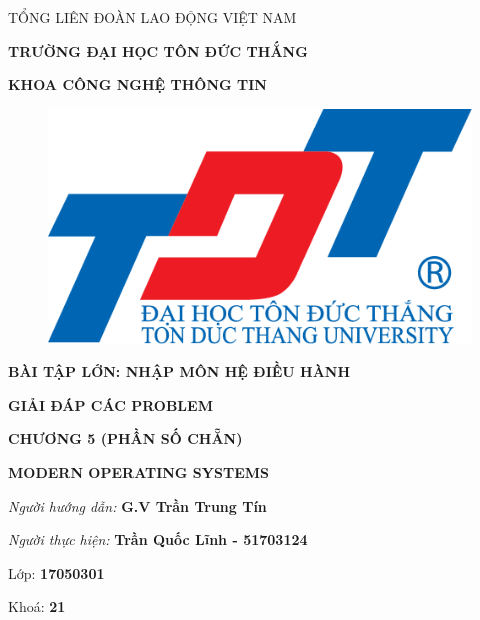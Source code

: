 \documentclass{report}
\begin{document}
\newcommand{\xfill}[2][1ex]{{%
  \dimen0=#2\advance\dimen0 by #1
  \leaders\hrule height \dimen0 depth -#1\hfill%
}}

\changefontsizes[14pt]{12pt}
\centerline{TỔNG LIÊN ĐOÀN LAO ĐỘNG VIỆT NAM}

\changefontsizes[14pt]{11pt}
\centerline{\textbf{TRƯỜNG ĐẠI HỌC TÔN ĐỨC THẮNG}}
\centerline{\textbf{KHOA CÔNG NGHỆ THÔNG TIN}}

\begin{center}
    \begin{figure}[htp]
    \begin{center}
     \includegraphics[scale=.2]{logo}
    \end{center}
    \end{figure}
\end{center}

\changefontsizes{16pt}
\centerline{\textbf{BÀI TẬP LỚN: NHẬP MÔN HỆ ĐIỀU HÀNH}}
\vspace{1.5cm}
\changefontsizes{24pt}
\centerline{\textbf{GIẢI ĐÁP CÁC PROBLEM}}
\centerline{\textbf{CHƯƠNG 5 (PHẦN SỐ CHẴN)}}
\centerline{\textbf{MODERN OPERATING SYSTEMS}}

\vspace{4cm}
\begin{flushright}
\renewcommand{\baselinestretch}{0.05}
\changefontsizes{14pt}
\textit{Người hướng dẫn: }\textbf{G.V Trần Trung Tín}
\setlength{\parskip}{0.5em}

\textit{Người thực hiện: }\textbf{Trần Quốc Lĩnh - 51703124}
\setlength{\parskip}{0.5em}

Lớp: \textbf{17050301}
\setlength{\parskip}{0.5em}

Khoá: \textbf{21}
\setlength{\parskip}{0.5em}

\end{flushright}
\end{document}
